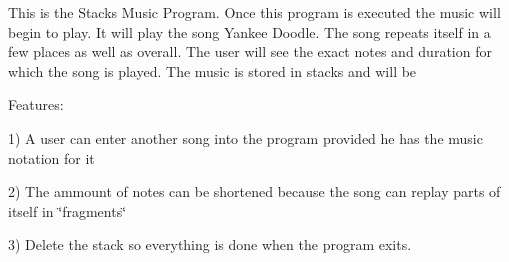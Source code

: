 This is the Stacks Music Program. Once this program is executed the music will begin to play. It will play the song Yankee Doodle. The song repeats itself in a few places as well as overall. The user will see the exact notes and duration for which the song is played. The music is stored in stacks and will be

Features\+:

1) A user can enter another song into the program provided he has the music notation for it

2) The ammount of notes can be shortened because the song can replay parts of itself in \char`\"{}fragments\char`\"{}

3) Delete the stack so everything is done when the program exits. 